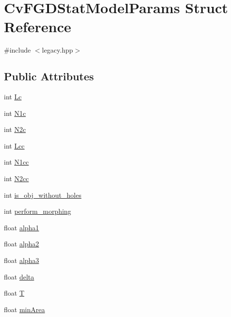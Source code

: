 \hypertarget{structCvFGDStatModelParams}{\section{Cv\-F\-G\-D\-Stat\-Model\-Params Struct Reference}
\label{structCvFGDStatModelParams}
}


{\ttfamily \#include $<$legacy.\-hpp$>$}

\subsection*{Public Attributes}
\begin{DoxyCompactItemize}
\item 
int \hyperlink{structCvFGDStatModelParams_aac86ba5f354a21a368a1df04742860ff}{Lc}
\item 
int \hyperlink{structCvFGDStatModelParams_af99c0e0c9ae588219f13583e22a715ed}{N1c}
\item 
int \hyperlink{structCvFGDStatModelParams_afb5e452daa801b83378b8fee545c5162}{N2c}
\item 
int \hyperlink{structCvFGDStatModelParams_a3ef6879a486b1b068129394d324612b0}{Lcc}
\item 
int \hyperlink{structCvFGDStatModelParams_abab3dcbc3510dc386ee536a3b6712b75}{N1cc}
\item 
int \hyperlink{structCvFGDStatModelParams_ae3e5c442d4f636c39d0180efd6910070}{N2cc}
\item 
int \hyperlink{structCvFGDStatModelParams_a5e06949f2ff0adf20bd5bb9059c0a179}{is\-\_\-obj\-\_\-without\-\_\-holes}
\item 
int \hyperlink{structCvFGDStatModelParams_ad22b9089be11b542b4868ba3dd1713d1}{perform\-\_\-morphing}
\item 
float \hyperlink{structCvFGDStatModelParams_ab1070d30fd82b26ec8766721122e8483}{alpha1}
\item 
float \hyperlink{structCvFGDStatModelParams_ace1a97cf24f397d30a522b66c9a9ec79}{alpha2}
\item 
float \hyperlink{structCvFGDStatModelParams_a975b153605ac09b3b04e263452169493}{alpha3}
\item 
float \hyperlink{structCvFGDStatModelParams_ac4fa054edef4b46290e1d81b95bffc39}{delta}
\item 
float \hyperlink{structCvFGDStatModelParams_ae622017985c5bb40a27fdb8fbc5aad95}{T}
\item 
float \hyperlink{structCvFGDStatModelParams_a211c52623f57ab66c72ba4db5696225d}{min\-Area}
\end{DoxyCompactItemize}


